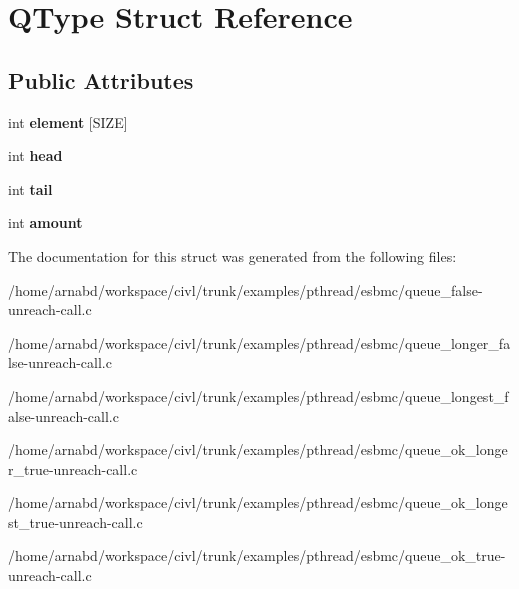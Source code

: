 \hypertarget{structQType}{}\section{Q\+Type Struct Reference}
\label{structQType}
\subsection*{Public Attributes}
\begin{DoxyCompactItemize}
\item 
\hypertarget{structQType_ab4983e7057e746f008ab1e1a35a4eef0}{}int {\bfseries element} \mbox{[}S\+I\+Z\+E\mbox{]}\label{structQType_ab4983e7057e746f008ab1e1a35a4eef0}

\item 
\hypertarget{structQType_ad6d0c272bf5cd1a96d29790e8ce0f274}{}int {\bfseries head}\label{structQType_ad6d0c272bf5cd1a96d29790e8ce0f274}

\item 
\hypertarget{structQType_a4173bad5cbd53245313e604571b1d0a6}{}int {\bfseries tail}\label{structQType_a4173bad5cbd53245313e604571b1d0a6}

\item 
\hypertarget{structQType_a47c23cfcbe7645b7376bb6ac88b2767d}{}int {\bfseries amount}\label{structQType_a47c23cfcbe7645b7376bb6ac88b2767d}

\end{DoxyCompactItemize}


The documentation for this struct was generated from the following files\+:\begin{DoxyCompactItemize}
\item 
/home/arnabd/workspace/civl/trunk/examples/pthread/esbmc/queue\+\_\+false-\/unreach-\/call.\+c\item 
/home/arnabd/workspace/civl/trunk/examples/pthread/esbmc/queue\+\_\+longer\+\_\+false-\/unreach-\/call.\+c\item 
/home/arnabd/workspace/civl/trunk/examples/pthread/esbmc/queue\+\_\+longest\+\_\+false-\/unreach-\/call.\+c\item 
/home/arnabd/workspace/civl/trunk/examples/pthread/esbmc/queue\+\_\+ok\+\_\+longer\+\_\+true-\/unreach-\/call.\+c\item 
/home/arnabd/workspace/civl/trunk/examples/pthread/esbmc/queue\+\_\+ok\+\_\+longest\+\_\+true-\/unreach-\/call.\+c\item 
/home/arnabd/workspace/civl/trunk/examples/pthread/esbmc/queue\+\_\+ok\+\_\+true-\/unreach-\/call.\+c\end{DoxyCompactItemize}
